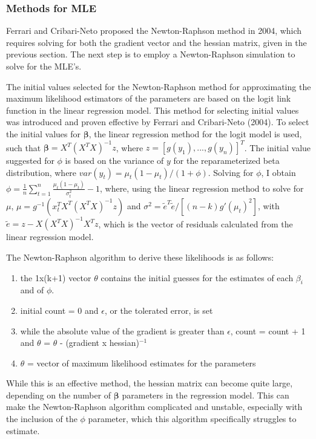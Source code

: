 \documentclass{svproc}
\begin{document}
\subsubsection{Methods for MLE}

Ferrari and Cribari-Neto proposed the Newton-Raphson method in 2004, which requires solving for both the gradient vector and the hessian matrix, given in the previous section. The next step is to employ a Newton-Raphson simulation to solve for the MLE's. 

The initial values selected for the Newton-Raphson method for approximating the maximum likelihood estimators of the parameters are based on the logit link function in the linear regression model. This method for selecting initial values was introduced and proven effective by Ferrari and Cribari-Neto (2004). To select the initial values for $\bm{\beta}$, the linear regression method for the logit model is used, such that $\bm{\beta} = X^T(X^TX)^{-1}z$, where $z=[g(y_1),...,g(y_n)]^T$. The initial value suggested for $\phi$ is based on the variance of $y$ for the reparameterized beta distribution, where $var(y_t) = \mu_t(1-\mu_t)/(1+\phi)$. Solving for $\phi$, I obtain $\phi = \frac{1}{n}\sum_{t=1}^{n}\frac{\mu_t(1-\mu_t)}{\sigma_t^2}-1$, where, using the linear regression method to solve for $\mu$, $\mu=g^{-1}(x_t^TX^T(X^TX)^{-1}z)$ and $\sigma^2=\tilde{e}^T\tilde{e}/[(n-k)g'(\mu_t)^2]$, with $\tilde{e}=z-X(X^TX)^{-1}X^Tz$, which is the vector of residuals calculated from the linear regression model.

The Newton-Raphson algorithm to derive these likelihoods is as follows:
\begin{enumerate}
\item the 1x(k+1) vector \textbf{$\theta$} contains the initial guesses for the estimates of each $\beta_i$ and of $\phi$. 
\item initial count = 0 and $\epsilon$, or the tolerated error, is set
\item while the absolute value of the gradient is greater than $\epsilon$, count = count + 1 and \textbf{$\theta$} = \textbf{$\theta$} - (gradient x hessian)$^{-1}$
\item \textbf{$\theta$} = vector of maximum likelihood estimates for the parameters 
\end{enumerate}

While this is an effective method, the hessian matrix can become quite large, depending on the number of $\bm{\beta}$ parameters in the regression model. This can make the Newton-Raphson algorithm complicated and unstable, especially with the inclusion of the $\phi$ parameter, which this algorithm specifically struggles to estimate. 
\end{document}
